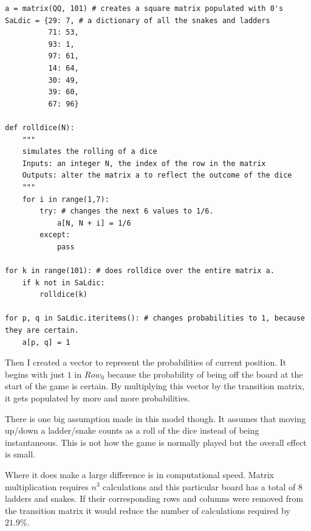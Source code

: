 \documentclass[a4paper]{article}
\begin{document}
\begin{verbatim}
a = matrix(QQ, 101) # creates a square matrix populated with 0's
SaLdic = {29: 7, # a dictionary of all the snakes and ladders
          71: 53,
          93: 1,
          97: 61,
          14: 64,
          30: 49,
          39: 60,
          67: 96}

def rolldice(N):
	"""
	simulates the rolling of a dice
	Inputs: an integer N, the index of the row in the matrix
	Outputs: alter the matrix a to reflect the outcome of the dice
	"""
	for i in range(1,7):
		try: # changes the next 6 values to 1/6.
			a[N, N + i] = 1/6
		except:
			pass

for k in range(101): # does rolldice over the entire matrix a.
    if k not in SaLdic:
        rolldice(k)

for p, q in SaLdic.iteritems(): # changes probabilities to 1, because they are certain.
    a[p, q] = 1
\end{verbatim}

Then I created a vector to represent the probabilities of current position. It begins with just $1$ in $Row_0$ because the probability of being off the board at the start of the game is certain. By multiplying this vector by the transition matrix, it gets populated by more and more probabilities.

There is one big assumption made in this model though. It assumes that moving up/down a ladder/snake counts as a roll of the dice instead of being instantaneous. This is not how the game is normally played but the overall effect is small.

Where it does make a large difference is in computational speed. Matrix multiplication requires $n^3$ calculations and this particular board has a total of 8 ladders and snakes. If their corresponding rows and columns were removed from the transition matrix it would reduce the number of calculations required by $21.9\%$.



\end{document}
